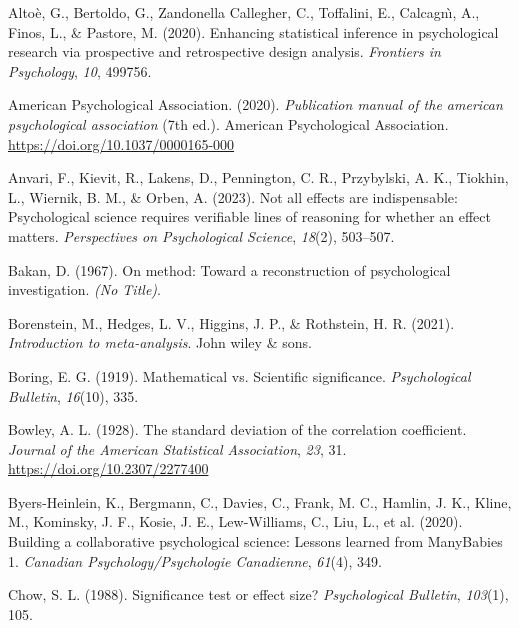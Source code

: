 \documentclass[
  man,floatsintext]{apa7}
\newlength{\cslhangindent}
\newenvironment{CSLReferences}[2] %
 {\begin{list}{}{%
  \setlength{\itemindent}{0pt}
  \setlength{\leftmargin}{0pt}
  \setlength{\parsep}{0pt}
  \ifodd #1
   \setlength{\leftmargin}{\cslhangindent}
   \setlength{\itemindent}{-1\cslhangindent}
  \fi
  \setlength{\itemsep}{#2\baselineskip}}}
 {\end{list}}
\begin{document}
\label{refs}
\begin{CSLReferences}{1}{0}
Altoè, G., Bertoldo, G., Zandonella Callegher, C., Toffalini, E., Calcagnı̀, A., Finos, L., \& Pastore, M. (2020). Enhancing statistical inference in psychological research via prospective and retrospective design analysis. \emph{Frontiers in Psychology}, \emph{10}, 499756.

American Psychological Association. (2020). \emph{Publication manual of the american psychological association} (7th ed.). American Psychological Association. \url{https://doi.org/10.1037/0000165-000}

Anvari, F., Kievit, R., Lakens, D., Pennington, C. R., Przybylski, A. K., Tiokhin, L., Wiernik, B. M., \& Orben, A. (2023). Not all effects are indispensable: Psychological science requires verifiable lines of reasoning for whether an effect matters. \emph{Perspectives on Psychological Science}, \emph{18}(2), 503--507.

Bakan, D. (1967). On method: Toward a reconstruction of psychological investigation. \emph{(No Title)}.

Borenstein, M., Hedges, L. V., Higgins, J. P., \& Rothstein, H. R. (2021). \emph{Introduction to meta-analysis}. John wiley \& sons.

Boring, E. G. (1919). Mathematical vs. Scientific significance. \emph{Psychological Bulletin}, \emph{16}(10), 335.

Bowley, A. L. (1928). The standard deviation of the correlation coefficient. \emph{Journal of the American Statistical Association}, \emph{23}, 31. \url{https://doi.org/10.2307/2277400}

Byers-Heinlein, K., Bergmann, C., Davies, C., Frank, M. C., Hamlin, J. K., Kline, M., Kominsky, J. F., Kosie, J. E., Lew-Williams, C., Liu, L., et al. (2020). Building a collaborative psychological science: Lessons learned from ManyBabies 1. \emph{Canadian Psychology/Psychologie Canadienne}, \emph{61}(4), 349.

Chow, S. L. (1988). Significance test or effect size? \emph{Psychological Bulletin}, \emph{103}(1), 105.


\end{CSLReferences}
\end{document}

